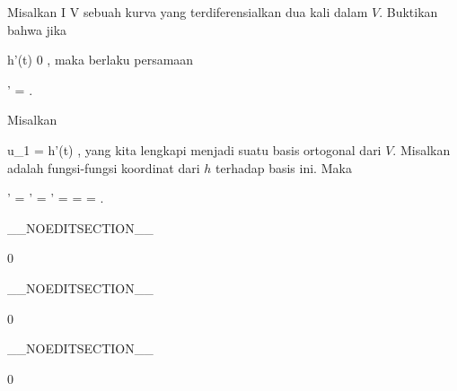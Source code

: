 {

Misalkan
 { I } { V
} {}
sebuah kurva yang terdiferensialkan dua kali dalam
$V$. Buktikan bahwa jika

\mavergleichskette
{\vergleichskette
{h'(t)
}
{ \neq }{ 0
}
{  }{
}
{    }{
}
{   }{
}
}
{}{}{,}
maka berlaku persamaan

\mavergleichskettedisp
{\vergleichskette
{  \Vert'
}
{ =} { {  }  \Vert
}
{ } {
}
{ } {
}
{ } {
}
}
{}{}{.}

}
{

Misalkan

\mavergleichskette
{\vergleichskette
{u_1
}
{ = }{ h'(t)
}
{  }{
}
{    }{
}
{   }{
}
}
{}{}{,}
yang kita lengkapi menjadi suatu basis ortogonal
 dari $V$. Misalkan
 adalah fungsi-fungsi koordinat dari $h$ terhadap basis ini. Maka

\mavergleichskettealign
{\vergleichskettealign
{  \Vert'
}
{ =} {  \Vert'
}
{ =} { '
}
{ =} { {  }
}
{ =} { {  }  
}
}
{
\vergleichskettefortsetzungalign
{ =} { {  }  \Vert
}
{ } {
}
{ } {}
{ } {}
}
{}{.}

 }

__NOEDITSECTION__

{0}

{

}
{  }

__NOEDITSECTION__

{0}

{

}
{  }

__NOEDITSECTION__

{0}

